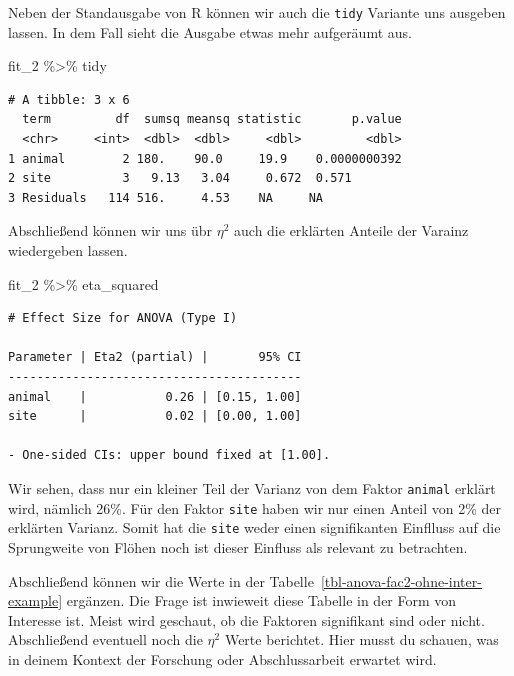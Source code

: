 \documentclass[
  letterpaper,
]{scrbook}
\newenvironment{Shaded}{\begin{snugshade}}{\end{snugshade}}
\newcommand{\NormalTok}[1]{\textcolor[rgb]{0.00,0.23,0.31}{#1}}
\newcommand{\SpecialCharTok}[1]{\textcolor[rgb]{0.37,0.37,0.37}{#1}}
\begin{document}
Neben der Standausgabe von R können wir auch die \texttt{tidy} Variante
uns ausgeben lassen. In dem Fall sieht die Ausgabe etwas mehr aufgeräumt
aus.

\begin{Shaded}
\begin{Highlighting}[]
\NormalTok{fit\_2 }\SpecialCharTok{\%\textgreater{}\%}\NormalTok{ tidy}
\end{Highlighting}
\end{Shaded}

\begin{verbatim}
# A tibble: 3 x 6
  term         df  sumsq meansq statistic       p.value
  <chr>     <int>  <dbl>  <dbl>     <dbl>         <dbl>
1 animal        2 180.    90.0     19.9    0.0000000392
2 site          3   9.13   3.04     0.672  0.571       
3 Residuals   114 516.     4.53    NA     NA           
\end{verbatim}

Abschließend können wir uns übr \(\eta^2\) auch die erklärten Anteile
der Varainz wiedergeben lassen.

\begin{Shaded}
\begin{Highlighting}[]
\NormalTok{fit\_2 }\SpecialCharTok{\%\textgreater{}\%}\NormalTok{ eta\_squared}
\end{Highlighting}
\end{Shaded}

\begin{verbatim}
# Effect Size for ANOVA (Type I)

Parameter | Eta2 (partial) |       95% CI
-----------------------------------------
animal    |           0.26 | [0.15, 1.00]
site      |           0.02 | [0.00, 1.00]

- One-sided CIs: upper bound fixed at [1.00].
\end{verbatim}

Wir sehen, dass nur ein kleiner Teil der Varianz von dem Faktor
\texttt{animal} erklärt wird, nämlich 26\%. Für den Faktor \texttt{site}
haben wir nur einen Anteil von 2\% der erklärten Varianz. Somit hat die
\texttt{site} weder einen signifikanten Einflluss auf die Sprungweite
von Flöhen noch ist dieser Einfluss als relevant zu betrachten.

Abschließend können wir die Werte in der
Tabelle~\ref{tbl-anova-fac2-ohne-inter-example} ergänzen. Die Frage ist
inwieweit diese Tabelle in der Form von Interesse ist. Meist wird
geschaut, ob die Faktoren signifikant sind oder nicht. Abschließend
eventuell noch die \(\eta^2\) Werte berichtet. Hier musst du schauen,
was in deinem Kontext der Forschung oder Abschlussarbeit erwartet wird.
\end{document}
